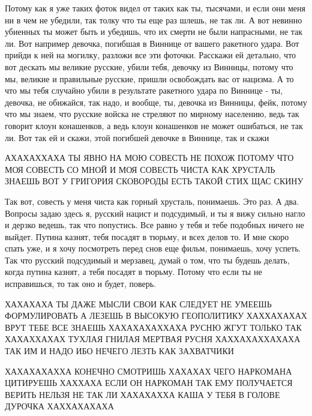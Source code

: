 Потому как я уже таких фоток видел от таких как ты, тысячами, и если они меня ни
в чем не убедили, так толку что ты еще раз шлешь, не так ли. А вот невинно
убиенных ты может быть и убедишь, что их смерти не были напрасными, не так ли.
Вот например девочка, погибшая в Виннице от вашего ракетного удара. Вот прийди
к ней на могилку, разложи все эти фоточки. Расскажи ей детально, что вот
дескать мы великие русские, убили тебя, девочку из Винницы, потому что мы,
великие и правильные русские, пришли освобождать вас от нацизма. А то что мы
тебя случайно убили в результате ракетного удара по Виннице - ты, девочка, не
обижайся, так надо, и вообще, ты, девочка из Винницы, фейк, потому что мы
знаем, что русские войска не стреляют по мирному населению, ведь так говорит
клоун конашенков, а ведь клоун конашенков не может ошибаться, не так ли. Вот
так ей и скажи, этой погибшей девочке в Виннице, так и скажи

АХАХАХХАХА ТЫ ЯВНО НА МОЮ СОВЕСТЬ НЕ ПОХОЖ ПОТОМУ ЧТО МОЯ СОВЕСТЬ СО МНОЙ И МОЯ
СОВЕСТЬ ЧИСТА КАК ХРУСТАЛЬ ЗНАЕШЬ ВОТ У ГРИГОРИЯ СКОВОРОДЫ ЕСТЬ ТАКОЙ СТИХ ЩАС
СКИНУ

Так вот, совесть у меня чиста как горный хрусталь, понимаешь. Это раз. А два.
Вопросы задаю здесь я, русский нацист и подсудимый, и ты я вижу сильно нагло и
дерзко ведешь, так что попустись. Все равно у тебя и тебе подобных ничего не
выйдет. Путина казнят, тебя посадят в тюрьму, и всех делов то. И мне скоро
спать уже, и я хочу посмотреть перед снов еще фильм, понимаешь, хочу успеть.
Так что русский подсудимый и мерзавец, думай о том, что ты будешь делать, когда
путина казнят, а тебя посадят в тюрьму. Потому что если ты не исправишься, то
так оно и будет, поверь.

ХАХАХАХА ТЫ ДАЖЕ МЫСЛИ СВОИ КАК СЛЕДУЕТ НЕ УМЕЕШЬ ФОРМУЛИРОВАТЬ А ЛЕЗЕШЬ В
ВЫСОКУЮ ГЕОПОЛИТИКУ ХАХХАХАХАХ ВРУТ ТЕБЕ ВСЕ ЗНАЕШЬ ХАХАХАХАХХАХА РУСНЮ ЖГУТ
ТОЛЬКО ТАК ХАХАХХАХАХ ТУХЛАЯ ГНИЛАЯ МЕРТВАЯ РУСНЯ ХАХХАХАХХАХАХА ТАК ИМ И НАДО
ИБО НЕЧЕГО ЛЕЗТЬ КАК ЗАХВАТЧИКИ

ХАХАХАХАХХА КОНЕЧНО СМОТРИШЬ ХАХАХАХ ЧЕГО НАРКОМАНА ЦИТИРУЕШЬ ХАХХАХА ЕСЛИ ОН
НАРКОМАН ТАК ЕМУ ПОЛУЧАЕТСЯ ВЕРИТЬ НЕЛЬЗЯ НЕ ТАК ЛИ ХАХАХАХХА КАША У ТЕБЯ В
ГОЛОВЕ ДУРОЧКА ХАХХАХАХАХА



